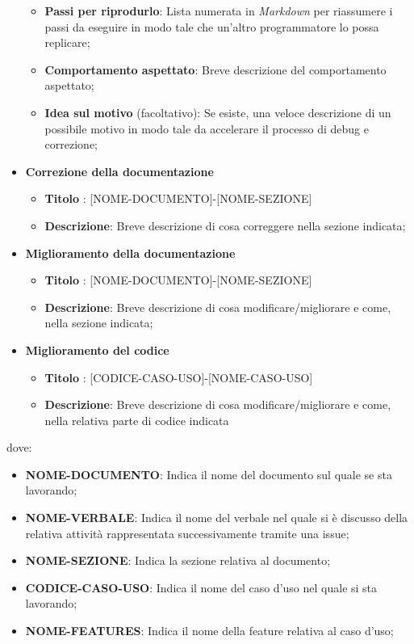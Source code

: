 \begin{itemize}
\begin{itemize}
                \item \textbf{Passi per riprodurlo}: Lista numerata in \textit{Markdown} per riassumere i passi da eseguire in modo tale che un'altro programmatore lo possa replicare;
                \item \textbf{Comportamento aspettato}: Breve descrizione del comportamento aspettato;
                \item \textbf{Idea sul motivo} (facoltativo): Se esiste, una veloce descrizione di un possibile motivo in modo tale da accelerare il processo di debug e correzione;
            \end{itemize}
            \item  \textbf{Correzione della documentazione}
            \begin{itemize}
                \item \textbf{Titolo} : [NOME-DOCUMENTO]-[NOME-SEZIONE]
                \item \textbf{Descrizione}: Breve descrizione di cosa correggere nella sezione indicata;
            \end{itemize}
            \item  \textbf{Miglioramento della documentazione}
            \begin{itemize}
                \item \textbf{Titolo} : [NOME-DOCUMENTO]-[NOME-SEZIONE]
                \item \textbf{Descrizione}: Breve descrizione di cosa modificare/migliorare e come, nella sezione indicata;
            \end{itemize}
            \item  \textbf{Miglioramento del codice}
            \begin{itemize}
                 \item \textbf{Titolo} : [CODICE-CASO-USO]-[NOME-CASO-USO]
                 \item \textbf{Descrizione}: Breve descrizione di cosa modificare/migliorare e come, nella relativa parte di codice indicata
            \end{itemize}
        \end{itemize}
        dove:

        \begin{itemize}
            \item \textbf{NOME-DOCUMENTO}: Indica il nome del documento sul quale se sta lavorando;
            \item \textbf{NOME-VERBALE}: Indica il nome del verbale nel quale si è discusso della relativa attività rappresentata successivamente tramite una issue;
            \item \textbf{NOME-SEZIONE}: Indica la sezione relativa al documento;
            \item \textbf{CODICE-CASO-USO}: Indica il nome del caso d'uso nel quale si sta lavorando;
            \item \textbf{NOME-FEATURES}: Indica il nome della feature relativa al caso d'uso;
        \end{itemize}


